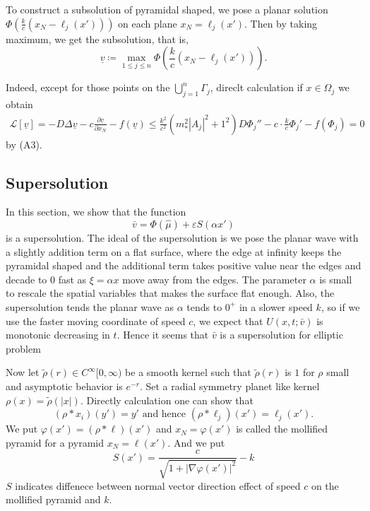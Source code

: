 \documentclass[12pt, a4paper]{article}
\numberwithin{equation}{section}
\renewcommand{\L}{\mathcal{L}}
\newcommand{\pd}[2]{\frac{\partial #1}{\partial #2}}
\begin{document}
\begin{CJK}{UTF8}{bkai}
	To construct a subsolution of pyramidal shaped, we pose a planar solution $\Phi\left(\frac{k}{c}(x_N-\ell_j(x'))\right)$ on each plane $x_N=\ell_j(x')$. Then by taking maximum, we get the subsolution, that is,
\begin{equation}\label{iden2.14}
	\underline{v}\coloneqq\max_{1\leq j\leq n}\Phi\left(\frac{k}{c}(x_N-\ell_j(x'))\right).
\end{equation}

	Indeed, except for those points on the $\bigcup\limits_{j=1}^n\Gamma_j$, direclt calculation if $x\in\Omega_j$ we obtain
\begin{align*}
	\L[\underline{v}]=-D\Delta\underline{v}-c\pd{\underline{v}}{x_N}-f(\underline{v})\leq \frac{k^2}{c^2}(m_*^2|A_j|^2+1^2)D\Phi_j''-c\cdot\frac{k}{c}\Phi_j'-f(\Phi_j)=0
\end{align*}
by (A3).






\subsection{Supersolution}
	In this section, we show that the function
\[
	\bar{v}=\Phi(\hat{\mu})+\varepsilon S(\alpha x')
\]
is a supersolution. The ideal of the supersolution is we pose the planar wave with a slightly addition term on a flat surface, where the edge at infinity keeps the pyramidal shaped and the additional term takes positive value near the edges and decade to $0$ fast as $\xi=\alpha x$  move away from the edges. The parameter $\alpha$ is small to rescale the spatial variables that makes the surface flat enough. Also, the supersolution tends the planar wave as $\alpha$  tends to $0^+$ in a slower speed $k$, so if we use the faster moving coordinate of speed $c$, we expect that $U(x,t;\bar{v})$ is monotonic decreasing in $t$. Hence it seems that $\bar{v}$ is a supersolution for elliptic problem

	Now let $\tilde{\rho}(r)\in C^\infty[0,\infty)$ be a smooth kernel such that $\tilde{\rho}(r)$ is $1$ for $\rho$ small and asymptotic behavior is $e^{-r}$. Set a radial symmetry planet like kernel $\rho(x)=\tilde{\rho}(|x|)$. Directly calculation one can show that
\[
	(\rho*x_i)(y')=y'\mbox{ and hence }(\rho*\ell_j)(x')=\ell_j(x').
\]
We put $\varphi(x')=(\rho*\ell)(x')$ and $x_N=\varphi(x')$ is called the mollified pyramid for a pyramid $x_N=\ell(x')$. And we put
\begin{equation}\label{iden2.15}
	S(x')=\frac{c}{\sqrt{1+|\nabla\varphi(x')|^2}}-k
\end{equation}
$S$ indicates diffenece between normal vector direction effect of  speed $c$ on the mollified pyramid and $k$. 


\end{CJK}
\end{document}
